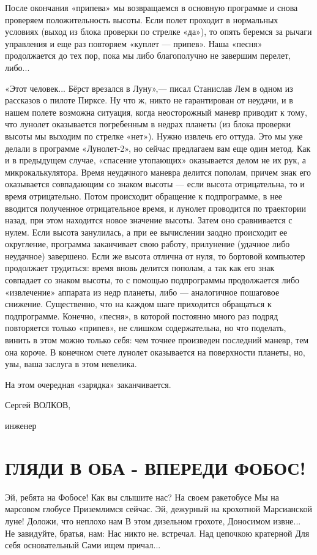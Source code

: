 \documentclass[11pt,a4paper,oneside]{article}
\begin{document}
После окончания «припева» мы возвращаемся в основную программе и снова проверяем положительность высоты. Если полет проходит в нормальных условиях (выход из блока проверки по стрелке «да»), то опять беремся за рычаги управления и еще раз повторяем «куплет — припев». Наша «песня» продолжается до тех пор, пока мы либо благополучно не завершим перелет, либо...

«Этот человек... Бёрст врезался в Луну»,— писал Станислав Лем в одном из рассказов о пилоте Пирксе. Ну что ж, никто не гарантирован от неудачи, и в нашем полете возможна ситуация, когда неосторожный маневр приводит к тому, что лунолет оказывается погребенным в недрах планеты (из блока проверки высоты мы выходим по стрелке «нет»). Нужно извлечь его оттуда. Это мы уже делали в программе «Лунолет-2», но сейчас предлагаем вам еще один метод. Как и в предыдущем случае, «спасение утопающих» оказывается делом не их рук, а микрокалькулятора. Время неудачного маневра делится пополам, причем знак его оказывается совпадающим со знаком высоты — если высота отрицательна, то и время отрицательно. Потом происходит обращение к подпрограмме, в нее вводится полученное отрицательное время, и лунолет проводится по траектории назад, при этом находится новое значение высоты. Затем оно сравнивается с нулем. Если высота занулилась, а при ее вычислении заодно происходит ее округление, программа заканчивает свою работу, прилунение (удачное либо неудачное) завершено. Если же высота отлична от нуля, то бортовой компьютер продолжает трудиться: время вновь делится пополам, а так как его знак совпадает со знаком высоты, то с помощью подпрограммы продолжается либо «извлечение» аппарата из недр планеты, либо — аналогичное пошаговое снижение. Существенно, что на каждом шаге приходится обращаться к подпрограмме. Конечно, «песня», в которой постоянно много раз подряд повторяется только «припев», не слишком содержательна, но что поделать, винить в этом можно только себя: чем точнее произведен последний маневр, тем она короче. В конечном счете лунолет оказывается на поверхности планеты, но, увы, ваша заслуга в этом невелика.

На этом очередная «зарядка» заканчивается.

Сергей ВОЛКОВ,

инженер


\section{ГЛЯДИ В ОБА - ВПЕРЕДИ ФОБОС!}
Эй, ребята на Фобосе!
Как вы слышите нас?
На своем ракетобусе Мы на марсовом глобусе Приземлимся сейчас.
Эй, дежурный на крохотной Марсианской луне!
Доложи, что неплохо нам В этом дизельном грохоте,
Доносимом извне...
Не завидуйте, братья, нам:
Нас никто не. встречал.
Над цепочкою кратерной Для себя основательный Сами ищем причал...
\end{document}
